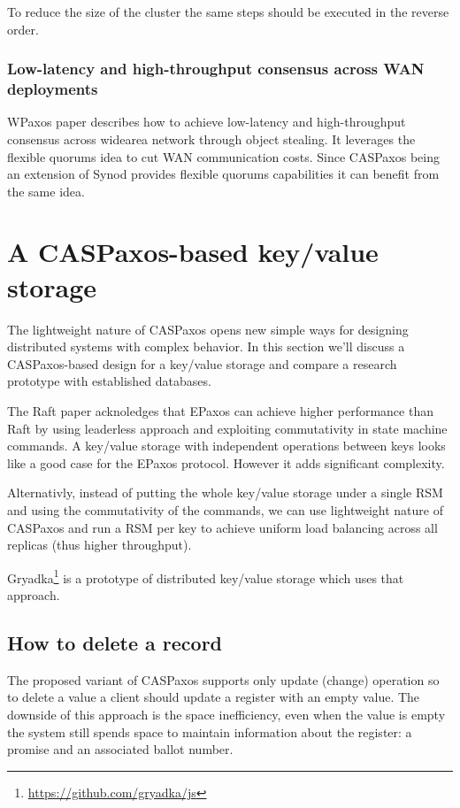 \documentclass[12pt]{article}
\begin{document}
To reduce the size of the cluster the same steps should be executed in the reverse order.

\subsubsection{Low-latency and high-throughput consensus across WAN deployments}

WPaxos\cite{wpaxos} paper describes how to achieve low-latency and high-throughput consensus across widearea network through object stealing. It leverages the flexible quorums\cite{fpaxos} idea to cut WAN communication costs. Since CASPaxos being an extension of Synod provides flexible quorums capabilities it can benefit from the same idea.

\section{A CASPaxos-based key/value storage}

The lightweight nature of CASPaxos opens new simple ways for designing distributed systems with complex behavior. In this section we'll discuss a CASPaxos-based design for a key/value storage and compare a research prototype with established databases.

The Raft paper acknoledges\cite{raft} that EPaxos\cite{epaxos} can achieve higher performance than Raft by using leaderless approach and exploiting commutativity in state machine commands. A key/value storage with independent operations between keys looks like a good case for the EPaxos protocol. However it adds significant complexity.

Alternativly, instead of putting the whole key/value storage under a single RSM and using the commutativity of the commands, we can use lightweight nature of CASPaxos and run a RSM per key to achieve uniform load balancing across all replicas (thus higher throughput).

Gryadka\footnote{\href{https://github.com/gryadka/js}{https://github.com/gryadka/js}} is a prototype of distributed key/value storage which uses that approach.

\subsection{How to delete a record}

The proposed variant of CASPaxos supports only update (change) operation so to delete a value a client should update a register with an empty value. The downside of this approach is the space inefficiency, even when the value is empty the system still spends space to maintain information about the register: a promise and an associated ballot number.
\end{document}
